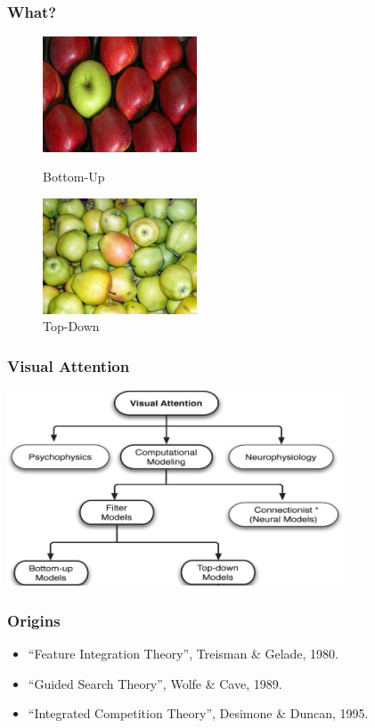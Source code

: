 \documentclass[notheorems,serif,table,compress]{beamer}  %
\begin{document}
\begin{frame}
\frametitle{What?}
\begin{figure}[!ht]
  \begin{minipage}[t]{0.46\textwidth}
  \includegraphics[width=1.8in]{apple1}
  \caption{Bottom-Up}
  \end{minipage}
  \begin{minipage}[t]{0.46\textwidth}
  \includegraphics[width=1.8in]{apple2}
  \caption{Top-Down}
  \end{minipage}
  \end{figure} 
\end{frame}


\begin{frame}
\frametitle{Visual Attention}
\centering\includegraphics[width=10cm]{VisualAttention}
\end{frame}


\begin{frame}
\frametitle{Origins}
\begin{itemize}
\item ``Feature Integration Theory'', Treisman \& Gelade, 1980.
\item ``Guided Search Theory'', Wolfe \& Cave, 1989.
\item ``Integrated Competition Theory'', Desimone \& Duncan, 1995.
\end{itemize}
\end{frame}
\end{document}
